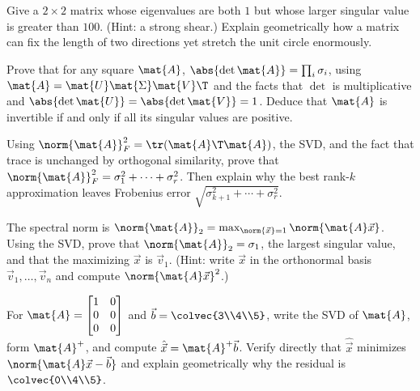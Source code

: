 \begin{exercise}
\label{ch29:ex-svd-vs-eig}
Give a $2\times 2$ matrix whose eigenvalues are both $1$ but whose larger
singular value is greater than $100$. (Hint: a strong shear.) Explain
geometrically how a matrix can fix the length of two directions yet stretch the
unit circle enormously.
\end{exercise}

\begin{exercise}
\label{ch29:ex-det}
Prove that for any square $\mat{A}$, $\abs{\det\mat{A}} = \prod_i \sigma_i$, using
$\mat{A} = \mat{U}\mat{\Sigma}\mat{V}\T$ and the facts that $\det$ is
multiplicative and $\abs{\det\mat{U}} = \abs{\det\mat{V}} = 1$. Deduce that
$\mat{A}$ is invertible if and only if all its singular values are positive.
\end{exercise}

\begin{exercise}
\label{ch29:ex-frob}
Using $\norm{\mat{A}}_F^2 = \tr(\mat{A}\T\mat{A})$, the SVD, and the fact that
trace is unchanged by orthogonal similarity, prove that
$\norm{\mat{A}}_F^2 = \sigma_1^2 + \cdots + \sigma_r^2$. Then explain why the best
rank-$k$ approximation leaves Frobenius error
$\sqrt{\sigma_{k+1}^2 + \cdots + \sigma_r^2}$.
\end{exercise}

\begin{exercise}
\label{ch29:ex-spectral}
The spectral norm is $\norm{\mat{A}}_2 = \max_{\norm{\vec{x}}=1}\norm{\mat{A}\vec{x}}$.
Using the SVD, prove that $\norm{\mat{A}}_2 = \sigma_1$, the largest singular
value, and that the maximizing $\vec{x}$ is $\vec{v}_1$. (Hint: write $\vec{x}$ in
the orthonormal basis $\vec{v}_1,\dots,\vec{v}_n$ and compute
$\norm{\mat{A}\vec{x}}^2$.)
\end{exercise}

\begin{exercise}
\label{ch29:ex-pinv}
For $\mat{A} = \begin{bmatrix} 1 & 0 \\ 0 & 0 \\ 0 & 0\end{bmatrix}$ and
$\vec{b} = \colvec{3\\4\\5}$, write the SVD of $\mat{A}$, form $\mat{A}^+$, and
compute $\hat{\vec{x}} = \mat{A}^+\vec{b}$. Verify directly that
$\hat{\vec{x}}$ minimizes $\norm{\mat{A}\vec{x} - \vec{b}}$ and explain
geometrically why the residual is $\colvec{0\\4\\5}$.
\end{exercise}

